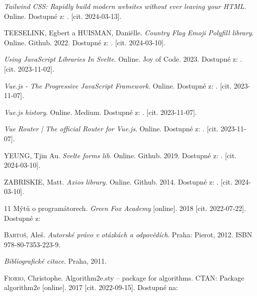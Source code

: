 \begin{thebibliography}{99}
\emph{Tailwind CSS: Rapidly build modern websites without ever leaving your HTML}. Online. Dostupné z: . [cit. 2024-03-13].

\textsc{TEESELINK}, Egbert a \textsc{HUISMAN}, Daniëlle. \emph{Country Flag Emoji Polyfill library}. Online. Github. 2022. Dostupné z: . [cit. 2024-03-10].

\emph{Using JavaScript Libraries In Svelte}. Online. Joy of Code. 2023. Dostupné z: . [cit. 2023-11-02].

\emph{Vue.js - The Progressive JavaScript Framework}. Online. Dostupné z: . [cit. 2023-11-07].

\emph{Vue.js history}. Online. Medium. Dostupné z: . [cit. 2023-11-07].

\emph{Vue Router | The official Router for Vue.js}. Online. Dostupné z: . [cit. 2023-11-07].

\textsc{YEUNG}, Tjin Au. \emph{Svelte forms lib}. Online. Github. 2019. Dostupné z: . [cit. 2024-03-10].

\textsc{ZABRISKIE}, Matt. \emph{Axios library}. Online. Github. 2014. Dostupné z: . [cit. 2024-03-10].



11 Mýtů o programátorech. \emph{Green Fox Academy} [online]. 2018 [cit. 2022-07-22]. Dostupné z: 

\textsc{Bartoš}, Aleš. \emph{Autorské právo v otázkách a odpovědích}. Praha: Pierot, 2012. ISBN 978-80-7353-223-9.

\emph{Bibliografické citace}. Praha, 2011.

\textsc{Fiorio}, Christophe. Algorithm2e.sty -- package for algorithms. CTAN: Package algorithm2e [online]. 2017 [cit. 2022-09-15]. Dostupné na: 


\end{thebibliography}
